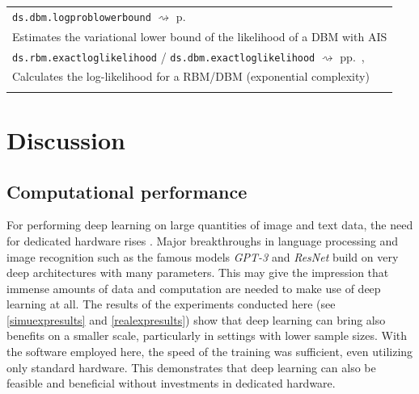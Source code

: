 \documentclass[12pt]{article}
\newcommand{\inlinecode}[1]{\texttt{#1}}
\newcommand{\apkg}[1]{\emph{#1}}
\newcommand{\rightpageref}[1]{\hfill $\rightsquigarrow$ p.\ \pageref{#1}}
\newcommand{\rightpagerefs}[2]{\hfill $\rightsquigarrow$ pp.\ \pageref{#1}, \pageref{#2}}
\begin{document}
\begin{table}[!htb]
\begin{tabularx}{\textwidth}{X}
\inlinecode{ds.dbm.logproblowerbound} \rightpageref{rdokitem_ds.dbm.logproblowerbound} \\
Estimates the variational lower bound of the likelihood of a DBM with AIS \\
\inlinecode{ds.rbm.exactloglikelihood} /
\inlinecode{ds.dbm.exactloglikelihood} \rightpagerefs{rdokitem_ds.dbm.exactloglikelihood}{rdokitem_ds.rbm.exactloglikelihood} \\
Calculates the log-likelihood for a RBM/DBM (exponential complexity)\\
   \Xhline{1pt}
\end{tabularx}
\end{table}



\clearpage
\FloatBarrier

\section{Discussion}

\subsection{Computational performance}
For performing deep learning on large quantities of image and text data, the need for dedicated hardware rises \citep{lecun_dlhardware}.
Major breakthroughs in language processing and image recognition such as the famous models {\em GPT-3} and \citep{gpt3} {\em ResNet} \citep{resnet} build on very deep architectures with many parameters.
This may give the impression that immense amounts of data and computation are needed to make use of deep learning at all.
The results of the experiments conducted here (see \ref{simuexpresults} and \ref{realexpresults}) show that deep learning can bring also benefits on a smaller scale, particularly in settings with lower sample sizes.
With the software employed here, the speed of the training was sufficient, even utilizing only standard hardware.
This demonstrates that deep learning can also be feasible and beneficial without investments in dedicated hardware.
\end{document}
